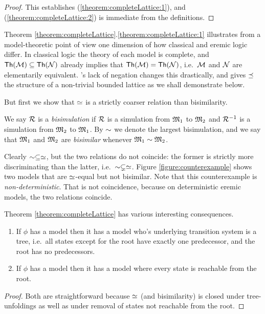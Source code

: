 \begin{proof}
This establishes (\ref{theorem:completeLattice:1}), and
(\ref{theorem:completeLattice:2}) is immediate from the definitions.


\end{proof}

\NI Theorem
\ref{theorem:completeLattice}.\ref{theorem:completeLattice:1}
illustrates from a model-theoretic point of view one dimension of how
classical and eremic logic differ. In classical logic the theory of
each model is complete, and $\mathsf{Th}(\mathcal{M}) \subseteq
\mathsf{Th}(\mathcal{N})$ already implies that $\mathsf{Th}(\mathcal{M}) =
\mathsf{Th}(\mathcal{N})$, i.e.~$\mathcal{M}$ and $\mathcal{N}$ are elementarily
equivalent. \ELFULL{}'s lack of negation changes this drastically, and
gives $\preceq$ the structure of a non-trivial bounded lattice as we
shall demonstrate below.

But first we show that $\simeq$ is a strictly coarser relation than 
bisimilarity.

\begin{definition}
We say $\mathcal{R}$ is a \emph{bisimulation} if $\mathcal{R}$ is a simulation from
$\frak{M}_1$ to $\frak{M}_2$ and $\mathcal{R}^{-1}$ is a simulation from $\frak{M}_2$ to
$\frak{M}_1$. By $\sim$ we denote the largest bisimulation, and we say
that $\frak{M}_1$ and $\frak{M}_2$ are \emph{bisimilar} whenever $\frak{M}_1
\sim \frak{M}_2$.
\end{definition}

Clearly $\sim \subseteq \simeq$, but the two relations do not
coincide: the former is strictly more discriminating than the latter,
i.e.~$\sim \subsetneq \simeq$. Figure \ref{figure:counterexample}
shows two models that are $\simeq$-equal but not bisimilar. Note
that this counterexample is \emph{non-deterministic}. That is not
coincidence, because on deterministic eremic models, the two relations
coincide.



Theorem \ref{theorem:completeLattice} has various interesting
consequences.

\begin{corollary}
\begin{enumerate}

\item If $\phi$ has a model then it has a model who's underlying
  transition system is a tree, i.e.~all states except for the root
  have exactly one predecessor, and the root has no predecessors.

\item If $\phi$ has a model then it has a model where every state is
  reachable from the root.

\end{enumerate}
\end{corollary}
\begin{proof}
Both are straightforward because $\simeq$ (and bisimilarity) is
closed under tree-unfoldings as well as under removal of states not
reachable from the root.
\end{proof}


